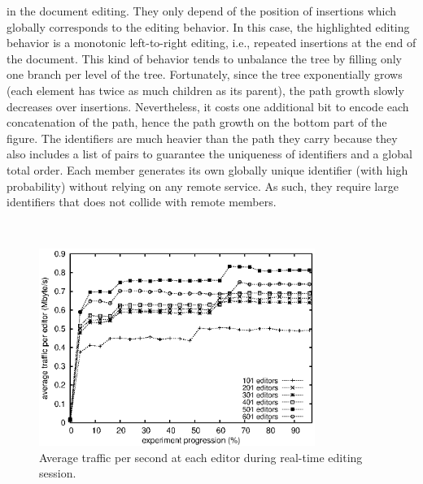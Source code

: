 \begin{asparadesc}
  in the document editing. They only depend of the position of insertions which
  globally corresponds to the editing behavior. In this case, the highlighted
  editing behavior is a monotonic left-to-right editing, i.e., repeated
  insertions at the end of the document. This kind of behavior tends to
  unbalance the tree by filling only one branch per level of the
  tree. Fortunately, since the tree exponentially grows (each element has twice
  as much children as its parent), the path growth slowly decreases over
  insertions. Nevertheless, it costs one additional bit to encode each
  concatenation of the path, hence the path growth on the bottom part of the
  figure. The identifiers are much heavier than the path they carry because they
  also includes a list of pairs to guarantee the uniqueness of identifiers and a
  global total order. Each member generates its own globally unique identifier
  (with high probability) without relying on any remote service. As such, they
  require large identifiers that does not collide with remote members.
\end{asparadesc}

\ \\

\begin{figure}
  \centering
  \includegraphics[width=0.8\textwidth]{./img/traffic.eps}
  \caption{\label{fig:traffic} Average traffic per second at each editor during
    real-time editing session.}
\end{figure}

